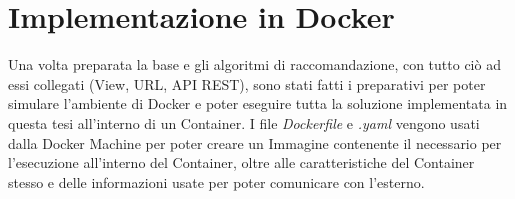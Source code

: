 \section*{Implementazione in Docker}
Una volta preparata la base e gli algoritmi di raccomandazione, con tutto ciò ad essi collegati (View, URL, API REST), sono stati fatti i 
preparativi per poter simulare l'ambiente di Docker e poter eseguire tutta la soluzione implementata in questa tesi all'interno di un 
Container.\hfill\break
I file \textit{Dockerfile} e \textit{.yaml} vengono usati dalla Docker Machine per poter creare un Immagine contenente il necessario per l'esecuzione 
all'interno del Container, oltre alle caratteristiche del Container stesso e delle informazioni usate per poter comunicare con l'esterno. 
